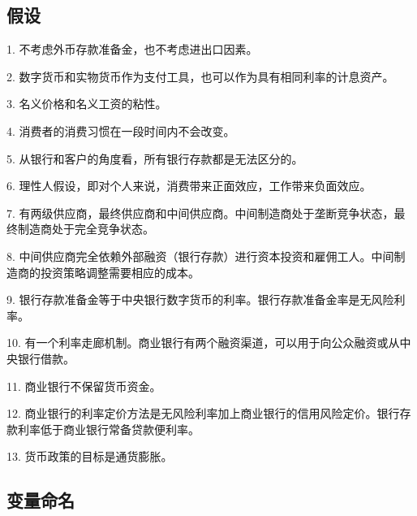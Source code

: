 \documentclass[withoutpreface,bwprint]{cumcmthesis} %
\begin{document}
\subsection{假设}

1. 不考虑外币存款准备金，也不考虑进出口因素。

2. 数字货币和实物货币作为支付工具，也可以作为具有相同利率的计息资产。

3. 名义价格和名义工资的粘性。

4. 消费者的消费习惯在一段时间内不会改变。

5. 从银行和客户的角度看，所有银行存款都是无法区分的。

6. 理性人假设，即对个人来说，消费带来正面效应，工作带来负面效应。

7. 有两级供应商，最终供应商和中间供应商。中间制造商处于垄断竞争状态，最终制造商处于完全竞争状态。

8. 中间供应商完全依赖外部融资（银行存款）进行资本投资和雇佣工人。中间制造商的投资策略调整需要相应的成本。

9. 银行存款准备金等于中央银行数字货币的利率。银行存款准备金率是无风险利率。

10. 有一个利率走廊机制。商业银行有两个融资渠道，可以用于向公众融资或从中央银行借款。

11. 商业银行不保留货币资金。

12. 商业银行的利率定价方法是无风险利率加上商业银行的信用风险定价。银行存款利率低于商业银行常备贷款便利率。

13. 货币政策的目标是通货膨胀。


\subsection{变量命名}
\end{document}

